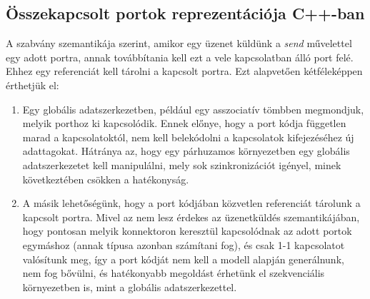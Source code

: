 \documentclass[a4paper,12pt]{report}
\begin{document}
\subsection{Összekapcsolt portok reprezentációja C++-ban} \label{conn_cpp}
A szabvány szemantikája szerint, amikor egy üzenet küldünk a \textit{send} művelettel egy adott portra, annak továbbítania kell ezt a vele kapcsolatban álló port felé. Ehhez egy referenciát kell tárolni a kapcsolt portra. Ezt alapvetően kétféleképpen érthetjük el:\\
\begin{enumerate}
\item Egy globális adatszerkezetben, például egy asszociatív tömbben megmondjuk, melyik porthoz ki kapcsolódik. Ennek előnye, hogy a port kódja független marad a kapcsolatoktól, nem kell belekódolni a kapcsolatok kifejezéséhez új adattagokat.
Hátránya az, hogy egy párhuzamos környezetben egy globális adatszerkezetet kell manipulálni, mely sok szinkronizációt igényel, minek következtében csökken a hatékonyság.
\item A másik lehetőségünk, hogy a port kódjában közvetlen referenciát tárolunk a kapcsolt portra. Mivel az nem lesz érdekes az üzenetküldés szemantikájában, hogy pontosan melyik konnektoron keresztül kapcsolódnak az adott portok egymáshoz (annak típusa azonban számítani fog), és csak 1-1 kapcsolatot valósítunk meg, így a port kódját nem kell a modell alapján generálnunk, nem fog bővülni, és hatékonyabb megoldást érhetünk el szekvenciális környezetben is, mint a globális adatszerkezettel. 
\end{enumerate}
\end{document}
